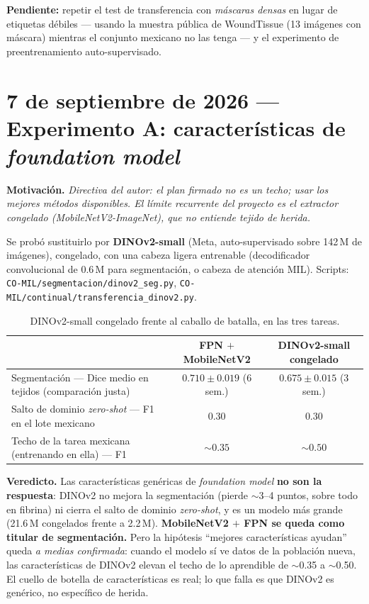 \documentclass[12pt,letterpaper]{report}
\newcommand{\entrada}[2]{%
    \vspace{0.6em}
    \noindent\textbf{#1.} \textit{#2}
    \vspace{0.3em}
    \par
}
\begin{document}
\textbf{Pendiente:} repetir el test de transferencia con \emph{máscaras densas} en lugar de etiquetas
débiles --- usando la muestra pública de WoundTissue (13 imágenes con máscara) mientras el conjunto
mexicano no las tenga --- y el experimento de preentrenamiento auto-supervisado.

\section{7 de septiembre de 2026 --- Experimento A: características de \emph{foundation model}}

\entrada{Motivación}{Directiva del autor: el plan firmado no es un techo; usar los mejores métodos
disponibles. El límite recurrente del proyecto es el extractor congelado (MobileNetV2-ImageNet), que
no entiende tejido de herida.}

Se probó sustituirlo por \textbf{DINOv2-small} (Meta, auto-supervisado sobre 142\,M de imágenes),
congelado, con una cabeza ligera entrenable (decodificador convolucional de 0.6\,M para segmentación,
o cabeza de atención MIL). Scripts: \texttt{CO-MIL/segmentacion/dinov2\_seg.py},
\texttt{CO-MIL/continual/transferencia\_dinov2.py}.

\begin{table}[H]
\centering
\caption{DINOv2-small congelado frente al caballo de batalla, en las tres tareas.}
\begin{tabular}{lcc}
\toprule
& FPN $+$ MobileNetV2 & DINOv2-small congelado \\
\midrule
Segmentación --- Dice medio en tejidos (comparación justa) & $0.710 \pm 0.019$ (6 sem.) & $0.675 \pm 0.015$ (3 sem.) \\
Salto de dominio \emph{zero-shot} --- F1 en el lote mexicano & $0.30$ & $0.30$ \\
Techo de la tarea mexicana (entrenando en ella) --- F1 & $\sim 0.35$ & $\sim 0.50$ \\
\bottomrule
\end{tabular}
\end{table}

\textbf{Veredicto.} Las características genéricas de \emph{foundation model} \textbf{no son la
respuesta}: DINOv2 no mejora la segmentación (pierde $\sim$3--4 puntos, sobre todo en fibrina) ni
cierra el salto de dominio \emph{zero-shot}, y es un modelo más grande (21.6\,M congelados frente a
2.2\,M). \textbf{MobileNetV2 $+$ FPN se queda como titular de segmentación.} Pero la hipótesis
``mejores características ayudan'' queda \emph{a medias confirmada}: cuando el modelo sí ve datos de la
población nueva, las características de DINOv2 elevan el techo de lo aprendible de $\sim$0.35 a
$\sim$0.50. El cuello de botella de características es real; lo que falla es que DINOv2 es genérico, no
específico de herida.
\end{document}
